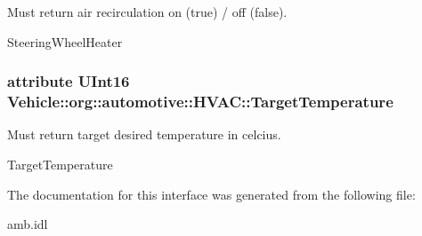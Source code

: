 Must return air recirculation on (true) / off (false). 

Steering\-Wheel\-Heater \hypertarget{interfaceVehicle_1_1org_1_1automotive_1_1HVAC_a8682058bc148bd26012722e67441af11}{
\subsubsection[{Target\-Temperature}]{\setlength{\rightskip}{0pt plus 5cm}attribute U\-Int16 Vehicle\-::org\-::automotive\-::\-H\-V\-A\-C\-::\-Target\-Temperature}}\label{interfaceVehicle_1_1org_1_1automotive_1_1HVAC_a8682058bc148bd26012722e67441af11}


Must return target desired temperature in celcius. 

Target\-Temperature 

The documentation for this interface was generated from the following file\-:\begin{DoxyCompactItemize}
\item 
amb.\-idl\end{DoxyCompactItemize}
